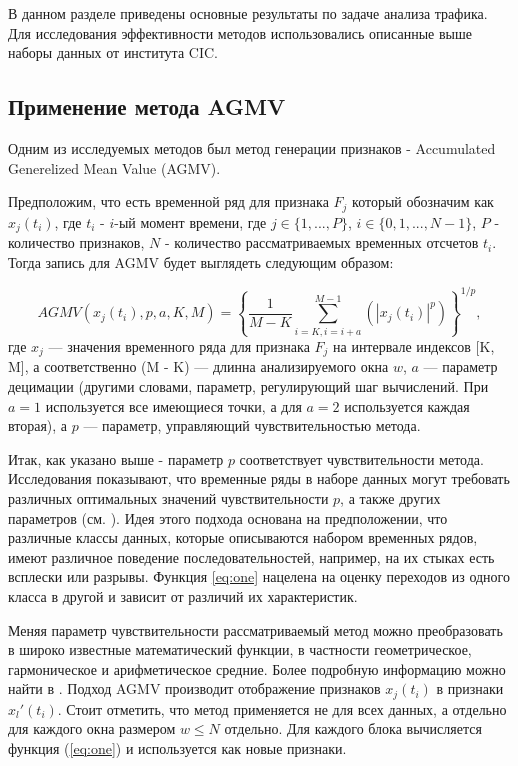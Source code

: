 В данном разделе приведены основные результаты по задаче анализа трафика. Для исследования эффективности методов использовались описанные выше наборы данных от института CIC.


\subsection{Применение метода AGMV}\label{sec:ch2/sect2/sub1}

Одним из исследуемых методов был метод генерации признаков - Accumulated Generelized Mean Value (AGMV). 

Предположим, что есть временной ряд для признака $F_{j}$ который обозначим как $x_{j}(t_{i})$, где $t_{i}$ - $i$-ый момент времени, где $j \in \{1,..., P\}$, $i \in \{0, 1, ..., N-1\}$, $P$ - количество признаков, $N$ - количество рассматриваемых временных отсчетов $t_i$. Тогда запись для AGMV будет выглядеть следующим образом:

\begin{equation}\label{eq:one}
	AGMV (x_j (t_i), p, a, K, M) = \left \{ \frac{1}{M-K}\sum_{i=K, i = i + a}^{M-1} (\left | x_j(t_i) \right |^{p}) \right \} ^{1/p},
\end{equation}
где $x_j$ — значения временного ряда для признака $F_j$ на интервале индексов [K, M], а соответственно (M - K) — длинна анализируемого окна $w$, $a$ — параметр децимации (другими словами, параметр, регулирующий шаг вычислений. При $a=1$ используется все имеющиеся точки, а для $a=2$  используется каждая вторая), а $p$ — параметр, управляющий чувствительностью метода.

Итак, как указано выше - параметр $p$ соответствует чувствительности метода. Исследования показывают, что временные ряды в наборе данных могут требовать различных оптимальных значений чувствительности $p$, а также других параметров (см. \cite{Ivch_2021}). %
Идея этого подхода основана на предположении, что различные классы данных, которые описываются набором временных рядов, имеют различное поведение последовательностей, например, на их стыках есть всплески или разрывы. Функция \ref{eq:one} нацелена на оценку переходов из одного класса в другой и зависит от различий их характеристик.

Меняя параметр чувствительности рассматриваемый метод можно преобразовать в широко известные математический функции, в частности геометрическое, гармоническое и арифметическое средние. Более подробную информацию можно найти в \cite{Ivch_2021}. Подход AGMV производит отображение признаков $x_j(t_i)$ в признаки $x_l'(t_i)$. Стоит отметить, что метод применяется не для всех данных, а отдельно для каждого окна размером $w \le N$ отдельно. Для каждого блока вычисляется функция (\ref{eq:one}) и используется как новые признаки. 


